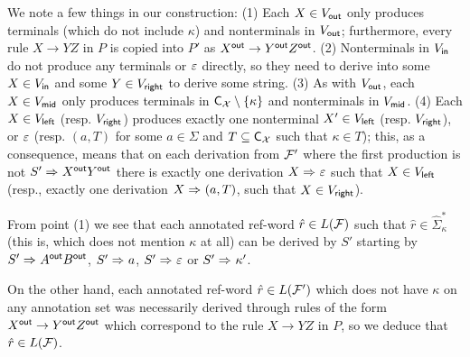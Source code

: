 We note a few things in our construction: (1) Each $X\in V_{\mathsf{out}}$ only produces terminals (which do not include $\kappa$) and nonterminals in $V_{\mathsf{out}}$; furthermore, every rule $X\to YZ$ in $P$ is copied into $P'$ as $X^{\mathsf{out}} \to Y^{\mathsf{out}} Z^{\mathsf{out}}$. (2) Nonterminals in $V_{\mathsf{in}}$ do not produce any terminals or $\varepsilon$ directly, so they need to derive into some $X\in V_{\mathsf{in}}$ and some $Y\in V_{\mathsf{right}}$ to derive some string. (3) As with $V_{\mathsf{out}}$, each $X\in V_{\mathsf{mid}}$ only produces terminals in $\textsf{C}_{\mathcal{X}}\setminus\{\kappa\}$ and nonterminals in $V_{\mathsf{mid}}$. (4) Each $X\in V_{\mathsf{left}}$ (resp. $V_{\mathsf{right}}$) produces exactly one nonterminal $X'\in V_{\mathsf{left}}$ (resp. $V_{\mathsf{right}}$), or $\varepsilon$ (resp. $(a, T)$ for some $a\in \Sigma$ and $T\subseteq\textsf{C}_{\mathcal{X}}$ such that $\kappa\in T$); this, as a consequence, means that on each derivation from $\mathcal{F}'$ where the first production is not $S' \Rightarrow_{} X^{\mathsf{out}} Y^{\mathsf{out}}$ there is exactly one derivation $X\Rightarrow_{}\varepsilon$ such that $X\in V_{\mathsf{left}}$ (resp., exactly one derivation $X\Rightarrow_{} (a, T)$, such that $X\in V_{\mathsf{right}}$).

From point (1) we see that each annotated ref-word $\hat{r}\in L(\mathcal{F})$ such that $\hat{r}\in\hat{\Sigma}_\kappa^*$ (this is, which does not mention $\kappa$ at all) can be derived by $S'$ starting by $S'\Rightarrow_{} A^{\mathsf{out}}B^{\mathsf{out}}$, $S'\Rightarrow_{} a$, $S'\Rightarrow_{} \varepsilon$ or $S'\Rightarrow_{} \kappa'$. 

On the other hand, each annotated ref-word $\hat{r}\in L(\mathcal{F}')$ which does not have $\kappa$ on any annotation set was necessarily derived through rules of the form $X^{\mathsf{out}}\to Y^{\mathsf{out}} Z^{\mathsf{out}}$ which correspond to the rule $X\to YZ$ in $P$, so we deduce that $\hat{r}\in L(\mathcal{F})$.

